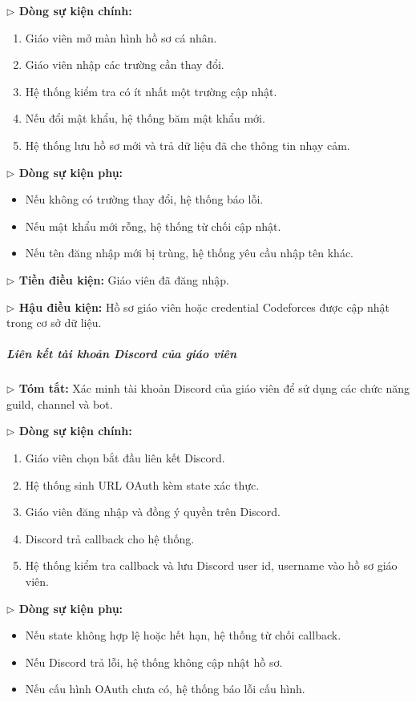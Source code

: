 \documentclass[12pt,a4paper]{article}
\begin{document}
\textbf{$\triangleright$ Dòng sự kiện chính:}
\begin{enumerate}[leftmargin=*]
\item Giáo viên mở màn hình hồ sơ cá nhân.
\item Giáo viên nhập các trường cần thay đổi.
\item Hệ thống kiểm tra có ít nhất một trường cập nhật.
\item Nếu đổi mật khẩu, hệ thống băm mật khẩu mới.
\item Hệ thống lưu hồ sơ mới và trả dữ liệu đã che thông tin nhạy cảm.
\end{enumerate}

\textbf{$\triangleright$ Dòng sự kiện phụ:}
\begin{itemize}[leftmargin=*]
\item Nếu không có trường thay đổi, hệ thống báo lỗi.
\item Nếu mật khẩu mới rỗng, hệ thống từ chối cập nhật.
\item Nếu tên đăng nhập mới bị trùng, hệ thống yêu cầu nhập tên khác.
\end{itemize}

\textbf{$\triangleright$ Tiền điều kiện:} Giáo viên đã đăng nhập.

\textbf{$\triangleright$ Hậu điều kiện:} Hồ sơ giáo viên hoặc credential Codeforces được cập nhật trong cơ sở dữ liệu.

\subparagraph{Liên kết tài khoản Discord của giáo viên}
\textbf{$\triangleright$ Tóm tắt:} Xác minh tài khoản Discord của giáo viên để sử dụng các chức năng guild, channel và bot.

\textbf{$\triangleright$ Dòng sự kiện chính:}
\begin{enumerate}[leftmargin=*]
\item Giáo viên chọn bắt đầu liên kết Discord.
\item Hệ thống sinh URL OAuth kèm state xác thực.
\item Giáo viên đăng nhập và đồng ý quyền trên Discord.
\item Discord trả callback cho hệ thống.
\item Hệ thống kiểm tra callback và lưu Discord user id, username vào hồ sơ giáo viên.
\end{enumerate}

\textbf{$\triangleright$ Dòng sự kiện phụ:}
\begin{itemize}[leftmargin=*]
\item Nếu state không hợp lệ hoặc hết hạn, hệ thống từ chối callback.
\item Nếu Discord trả lỗi, hệ thống không cập nhật hồ sơ.
\item Nếu cấu hình OAuth chưa có, hệ thống báo lỗi cấu hình.
\end{itemize}
\end{document}
